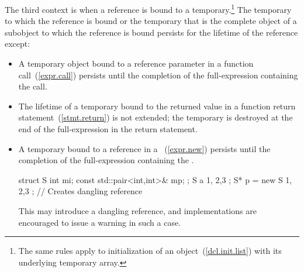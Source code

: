 \pnum
The third context is when a reference is bound to a
temporary.\footnote{The same rules apply to initialization of an
   object~(\ref{dcl.init.list}) with its
  underlying temporary array.}
The temporary to which the reference is bound or the temporary
that is the complete object of a subobject to which the reference is bound
persists for the lifetime of the reference except:

\begin{itemize}
\item A temporary object bound to a reference parameter in a function call~(\ref{expr.call})
persists until the completion of the full-expression containing the call.

\item The lifetime of a temporary bound to the returned value in a function return statement~(\ref{stmt.return}) is not extended; the temporary is destroyed at the end of the full-expression in the return statement.

\item A temporary bound to a reference in a ~(\ref{expr.new}) persists until the completion of the full-expression containing the . \begin{example}
\begin{codeblock}
struct S { int mi; const std::pair<int,int>& mp; };
S a { 1, {2,3} };
S* p = new S{ 1, {2,3} };   // Creates dangling reference
\end{codeblock}
\end{example} \begin{note} This may introduce a dangling reference, and implementations are encouraged to issue a warning in such a case. \end{note}
\end{itemize}

